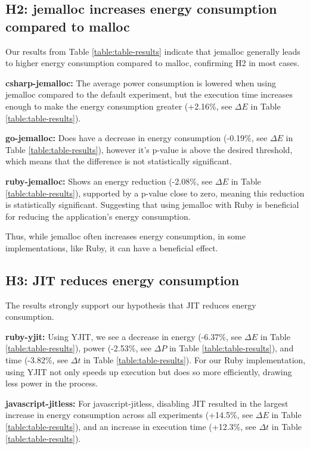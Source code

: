 \documentclass[main.tex]{subfiles}
\begin{document}
\subsection{H2: jemalloc increases energy consumption compared to malloc}

Our results from Table \ref{table:table-results} indicate that jemalloc generally leads to higher energy consumption compared to malloc, confirming H2 in most cases.

\textbf{csharp-jemalloc:} The average power consumption is lowered when using jemalloc compared to the default experiment, but the execution time increases enough to make the energy consumption greater (+2.16\%, see $\Delta E$ in Table \ref{table:table-results}).

\textbf{go-jemalloc:} Does have a decrease in energy consumption (-0.19\%, see $\Delta E$ in Table \ref{table:table-results}), however it's p-value is above the desired threshold, which means that the difference is not statistically significant. 

\textbf{ruby-jemalloc:} Shows an energy reduction (-2.08\%, see $\Delta E$ in Table \ref{table:table-results}), supported by a p-value close to zero, meaning this reduction is statistically significant. Suggesting that using jemalloc with Ruby is beneficial for reducing the application's energy consumption. 
 
Thus, while jemalloc often increases energy consumption, in some implementations, like Ruby, it can have a beneficial effect.

\subsection{H3: JIT reduces energy consumption}

The results strongly support our hypothesis that JIT reduces energy consumption.

\textbf{ruby-yjit:} Using YJIT, we see a decrease in energy (-6.37\%, see $\Delta E$ in Table \ref{table:table-results}), power (-2.53\%, see $\Delta P$ in Table \ref{table:table-results}), and time (-3.82\%, see $\Delta t$ in Table \ref{table:table-results}). For our Ruby implementation, using YJIT not only speeds up execution but does so more efficiently, drawing less power in the process.

\textbf{javascript-jitless:} For javascript-jitless, disabling JIT resulted in the largest increase in energy consumption across all experiments (+14.5\%, see $\Delta E$ in Table \ref{table:table-results}), and an increase in execution time (+12.3\%, see $\Delta t$ in Table \ref{table:table-results}).
\end{document}
